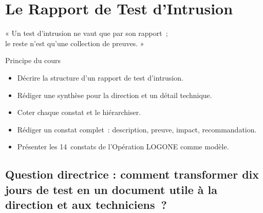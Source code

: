 
\chapter{Le Rapport de Test d'Intrusion}
\label{chap:rapport}

\epigraph{%
    « Un test d'intrusion ne vaut que par son rapport~;\\
    le reste n'est qu'une collection de preuves. »%
}{Principe du cours}


\begin{boxobjectifs}
\begin{itemize}
    \item Décrire la structure d'un rapport de test d'intrusion.
    \item Rédiger une synthèse pour la direction et un détail technique.
    \item Coter chaque constat et le hiérarchiser.
    \item Rédiger un constat complet~: description, preuve, impact,
          recommandation.
    \item Présenter les 14~constats de l'Opération LOGONE comme modèle.
\end{itemize}
\end{boxobjectifs}

\bigskip

\section*{Question directrice : comment transformer dix jours de test en un document utile à la direction et aux techniciens~?}


